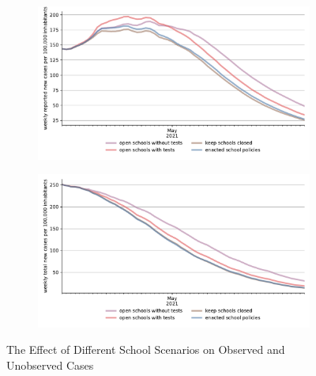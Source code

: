 \begin{figure}[ht]
  \centering
  \begin{subfigure}{.6\textwidth}
    \includegraphics[width=0.9 \textwidth]{figures/results/figures/scenario_comparisons/school_scenarios/full_new_known_case}
  \end{subfigure}%
  \begin{subfigure}{.6\textwidth}
    \includegraphics[width=0.9 \textwidth]{figures/results/figures/scenario_comparisons/school_scenarios/full_newly_infected}
  \end{subfigure}
  \caption{The Effect of Different School Scenarios on Observed and Unobserved Cases}
  \label{fig:school_scenarios_detailed}
\end{figure}


\FloatBarrier
